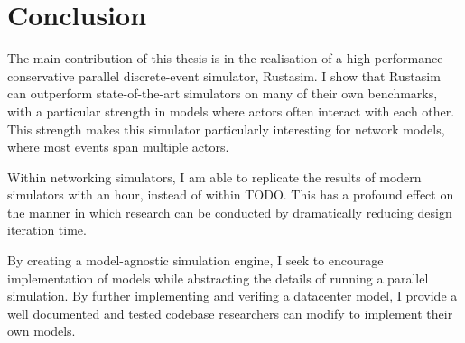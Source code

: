 \chapter{Conclusion} \label{conclusion}

The main contribution of this thesis is in the realisation of a high-performance conservative parallel discrete-event simulator, Rustasim.
I show that Rustasim can outperform state-of-the-art simulators on many of their own benchmarks, with a particular strength in models where actors often interact with each other.
This strength makes this simulator particularly interesting for network models, where most events span multiple actors.

Within networking simulators, I am able to replicate the results of modern simulators with an hour, instead of within TODO.
This has a profound effect on the manner in which research can be conducted by dramatically reducing design iteration time.

By creating a model-agnostic simulation engine, I seek to encourage implementation of models while abstracting the details of running a parallel simulation.
By further implementing and verifing a datacenter model, I provide a well documented and tested codebase researchers can modify to implement their own models.
